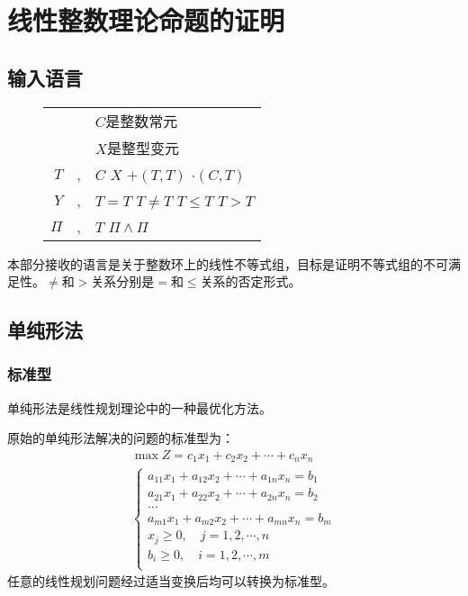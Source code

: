 \chapter{线性整数理论命题的证明}
\label{chap:lia}

\section{输入语言}
\begin{figure}[!htbp]
  \centering
  \begin{tabular}[rcl]{rcl}
    & & $C$是整数常元 \\
    & & $X$是整型变元 \\
    $T$ & \sep{} & $C$ \deli{} $X$ \deli{} $+(T, T)$ \deli{} $\cdot(C, T)$ \\
    $Y$ & \sep{} & $T = T$ \deli{} $T \neq T$ \deli{} $T \leq T$ \deli{} $T > T$ \\
    $\Pi$ & \sep{} & $T$ \deli{} $\Pi \land \Pi$ \\
  \end{tabular}
\end{figure}
本部分接收的语言是关于整数环上的线性不等式组，目标是证明不等式组的不可满足性。$\neq$和$>$关系分别是$=$和$\leq$关系的否定形式。

\section{单纯形法}
\subsection{标准型}
单纯形法是线性规划理论中的一种最优化方法。

原始的单纯形法解决的问题的标准型为：
\begin{eqnarray*}
  \max Z = c_1x_1 + c_2x_2 + \cdots + c_nx_n \\
  \begin{cases}
    a_{11}x_1 + a_{12}x_2 + \cdots + a_{1n}x_n = b_1 \\
    a_{21}x_1 + a_{22}x_2 + \cdots + a_{2n}x_n = b_2 \\
    \dots \\
    a_{m1}x_1 + a_{m2}x_2 + \cdots + a_{mn}x_n = b_m \\
    x_j \ge 0, \quad j = 1, 2, \cdots, n \\
    b_i \ge 0, \quad i = 1, 2, \cdots, m \\
  \end{cases}
\end{eqnarray*}
任意的线性规划问题经过适当变换后均可以转换为标准型。

